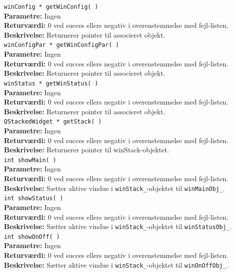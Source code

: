 \verb+winConfig * getWinConfig( )+\\
\textbf{Parametre:} Ingen \\
\textbf{Returværdi:} 0 ved succes ellers negativ i overenstemmelse med fejl-listen. \\
\textbf{Beskrivelse:} Returnerer pointer til associeret objekt.\\

\verb+winConfigPar * getWinConfigPar( )+\\
\textbf{Parametre:} Ingen \\
\textbf{Returværdi:} 0 ved succes ellers negativ i overenstemmelse med fejl-listen. \\
\textbf{Beskrivelse:} Returnerer pointer til associeret objekt.\\

\verb+winStatus * getWinStatus( )+\\
\textbf{Parametre:} Ingen \\
\textbf{Returværdi:} 0 ved succes ellers negativ i overenstemmelse med fejl-listen. \\
\textbf{Beskrivelse:} Returnerer pointer til associeret objekt.\\

\verb+QStackedWidget * getStack( )+\\
\textbf{Parametre:} Ingen \\
\textbf{Returværdi:} 0 ved succes ellers negativ i overenstemmelse med fejl-listen. \\
\textbf{Beskrivelse:} Returnerer pointer til winStack-objektet.\\

\verb+int showMain( )+\\
\textbf{Parametre:} Ingen \\
\textbf{Returværdi:} 0 ved succes ellers negativ i overenstemmelse med fejl-listen. \\
\textbf{Beskrivelse:} Sætter aktive vindue i \verb+winStack_+-objektet til \verb+winMainObj_+.\\

\verb+int showStatus( )+\\
\textbf{Parametre:} Ingen \\
\textbf{Returværdi:} 0 ved succes ellers negativ i overenstemmelse med fejl-listen. \\
\textbf{Beskrivelse:} Sætter aktive vindue i \verb+winStack_+-objektet til \verb+winStatusObj_+.\\

\verb+int showOnOff( )+\\
\textbf{Parametre:} Ingen \\
\textbf{Returværdi:} 0 ved succes ellers negativ i overenstemmelse med fejl-listen. \\
\textbf{Beskrivelse:} Sætter aktive vindue i \verb+winStack_+-objektet til \verb+winOnOffObj_+.\\

